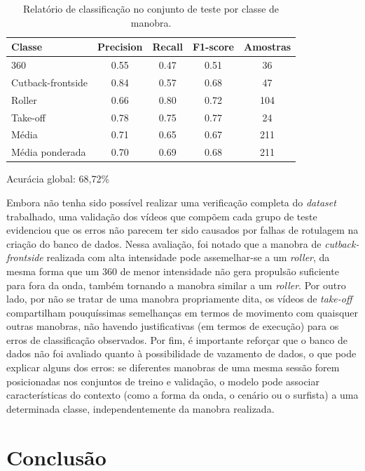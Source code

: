 \documentclass[12pt,a4paper, brazilian]{article}
\begin{document}
{{\begin{table}[htbp]
\centering
\footnotesize 
\caption{Relatório de classificação no conjunto de teste por classe de manobra.}
\label{tab:classification_report}
\begin{tabular}{lcccc}
\toprule
\textbf{Classe} & \textbf{Precision} & \textbf{Recall} & \textbf{F1-score} & \textbf{Amostras} \\
\midrule
360                & 0.55 & 0.47 & 0.51 & 36  \\
Cutback-frontside  & 0.84 & 0.57 & 0.68 & 47  \\
Roller             & 0.66 & 0.80 & 0.72 & 104 \\
Take-off           & 0.78 & 0.75 & 0.77 & 24  \\
\midrule
Média         & 0.71 & 0.65 & 0.67 & 211 \\
Média ponderada       & 0.70 & 0.69 & 0.68 & 211 \\
\bottomrule
\end{tabular}

\vspace{0.2cm}
\small Acurácia global: 68,72\%
\end{table}

Embora não tenha sido possível realizar uma verificação completa do \textit{ \textit{dataset} } trabalhado, uma validação dos vídeos que compõem cada grupo de teste evidenciou que os erros não parecem ter sido causados por falhas de rotulagem na criação do banco de dados. Nessa avaliação, foi notado que a manobra de \textit{cutback-frontside} realizada com alta intensidade pode assemelhar-se a um \textit{roller}, da mesma forma que um 360 de menor intensidade não gera propulsão suficiente para fora da onda, também tornando a manobra similar a um \textit{roller}. Por outro lado, por não se tratar de uma manobra propriamente dita, os vídeos de \textit{take-off} compartilham pouquíssimas semelhanças em termos de movimento com quaisquer outras manobras, não havendo justificativas (em termos de execução) para os erros de classificação observados. Por fim, é importante reforçar que o banco de dados não foi avaliado quanto à possibilidade de vazamento de dados, o que pode explicar alguns dos erros: se diferentes manobras de uma mesma sessão forem posicionadas nos conjuntos de treino e validação, o modelo pode associar características do contexto (como a forma da onda, o cenário ou o surfista) a uma determinada classe, independentemente da manobra realizada.

\section{Conclusão}

}}
\end{document}
